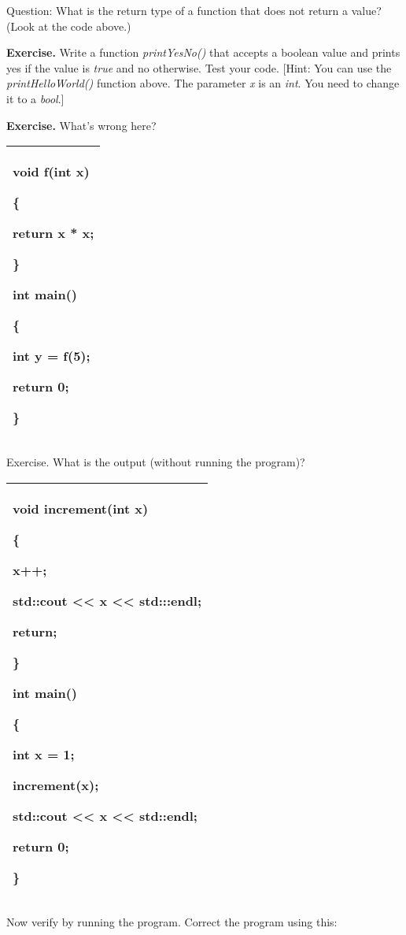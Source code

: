 \documentclass[
]{article}
\begin{document}
Question: What is the return type of a function that does not return a
value? (Look at the code above.)

\textbf{Exercise.} Write a function \emph{printYesNo()} that accepts a
boolean value and prints yes if the value is \emph{true} and no
otherwise. Test your code. {[}Hint: You can use the
\emph{printHelloWorld()} function above. The parameter \emph{x} is an
\emph{int}. You need to change it to a \emph{bool}.{]}

\textbf{Exercise.} What's wrong here?

\begin{longtable}[]{@{}l@{}}
\toprule
\endhead
\begin{minipage}[t]{0.97\columnwidth}\raggedright
void f(int x)

\{

return x * x;

\}

int main()

\{

int y = f(5);

return 0;

\}\strut
\end{minipage}\tabularnewline
\bottomrule
\end{longtable}

Exercise. What is the output (without running the program)?

\begin{longtable}[]{@{}l@{}}
\toprule
\endhead
\begin{minipage}[t]{0.97\columnwidth}\raggedright
void increment(int x)

\{

x++;

std::cout \textless\textless{} x \textless\textless{} std:::endl;

return;

\}

int main()

\{

int x = 1;

increment(x);

std::cout \textless\textless{} x \textless\textless{} std::endl;

return 0;

\}\strut
\end{minipage}\tabularnewline
\bottomrule
\end{longtable}

Now verify by running the program. Correct the program using this:
\end{document}
